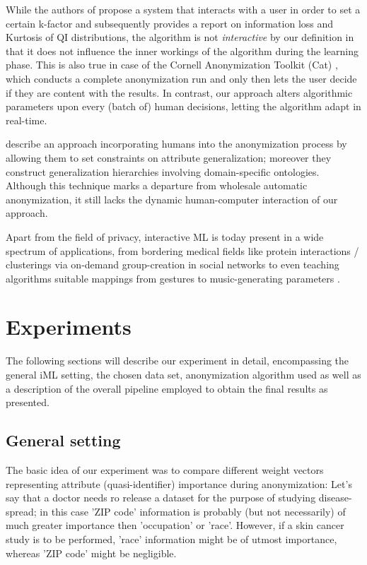 \documentclass{llncs}
\begin{document}
While the authors of \cite{Moque2012} propose a system that interacts with a user in order to set a certain k-factor and subsequently provides a report on information loss and Kurtosis of QI distributions, the algorithm is not \textit{interactive} by our definition in that it does not influence the inner workings of the algorithm during the learning phase. This is also true in case of the Cornell Anonymization Toolkit (Cat) \cite{Xiao2009}, which conducts a complete anonymization run and only then lets the user decide if they are content with the results. In contrast, our approach alters algorithmic parameters upon every (batch of) human decisions, letting the algorithm adapt in real-time.

\cite{Loh2010} describe an approach incorporating humans into the anonymization process by allowing them to set constraints on attribute generalization; moreover they construct generalization hierarchies involving domain-specific ontologies. Although this technique marks a departure from wholesale automatic anonymization, it still lacks the dynamic human-computer interaction of our approach.

Apart from the field of privacy, interactive ML is today present in a wide spectrum of applications, from bordering medical fields like protein interactions / clusterings \cite{Amershi2014} via on-demand group-creation in social networks \cite{Amershi2012} to even teaching algorithms suitable mappings from gestures to music-generating parameters \cite{Fiebrink2009}.



\section{Experiments}
\label{sect:experiments}

The following sections will describe our experiment in detail, encompassing the general iML setting, the chosen  data set, anonymization algorithm used as well as a description of the overall pipeline employed to obtain the final results as presented.


\subsection{General setting}
\label{sect:setting}

The basic idea of our experiment was to compare different weight vectors representing attribute (quasi-identifier) importance during anonymization: Let's say that a doctor needs ro release a dataset for the purpose of studying disease-spread; in this case 'ZIP code' information is probably (but not necessarily) of much greater importance then 'occupation' or 'race'. However, if a skin cancer study is to be performed, 'race' information might be of utmost importance, whereas 'ZIP code' might be negligible.
\end{document}
